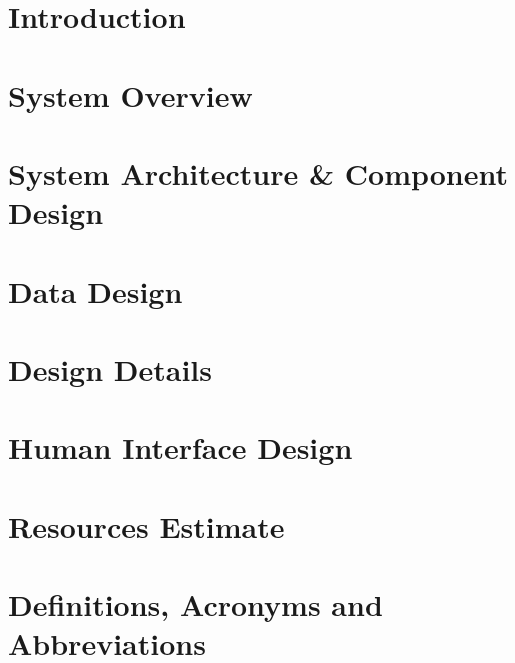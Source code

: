 \documentclass[10pt,a4paper,titlepage]{article}
\begin{document}
	\newpage	
	\section{Introduction}
		
	\newpage
	\section{System Overview}
		
	\newpage
	\section{System Architecture \& Component Design}
		
	\newpage
	\section{Data Design}
		
	\newpage
	\section{Design Details}
		
	\newpage
	\section{Human Interface Design}
		
	\newpage
	\section{Resources Estimate}
		
	\newpage
	\section{Definitions, Acronyms and Abbreviations}
			
\end{document}
